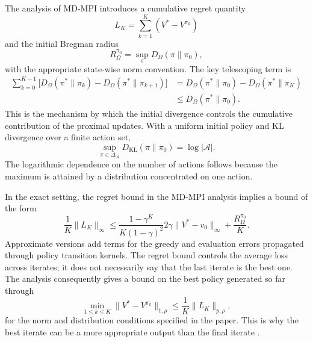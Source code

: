 The analysis of MD-MPI introduces a cumulative regret quantity
\begin{equation}
    L_K=\sum_{k=1}^{K}(V^*-V^{\pi_k})
    \label{eq:rl-mdmpi-regret}
\end{equation}
and the initial Bregman radius
\begin{equation}
    R_{\Omega}^{\pi_0}
    =\sup_{\pi}D_\Omega(\pi\|\pi_0),
    \label{eq:rl-mdmpi-radius}
\end{equation}
with the appropriate state-wise norm convention. The key telescoping term is
\begin{equation}
    \begin{aligned}
    \sum_{k=0}^{K-1}
    \bigl[D_\Omega(\pi^*\|\pi_k)
         -D_\Omega(\pi^*\|\pi_{k+1})\bigr]
    &=D_\Omega(\pi^*\|\pi_0)
      -D_\Omega(\pi^*\|\pi_K)\\
    &\leq D_\Omega(\pi^*\|\pi_0).
    \end{aligned}
    \label{eq:rl-bregman-telescoping}
\end{equation}
This is the mechanism by which the initial divergence controls the cumulative
contribution of the proximal updates. With a uniform initial policy and KL
divergence over a finite action set,
\begin{equation}
    \sup_{\pi\in\Delta_{\mathcal A}}
    D_{\mathrm{KL}}(\pi\|\pi_0)=\log|\mathcal A|.
    \label{eq:rl-uniform-kl-radius}
\end{equation}
The logarithmic dependence on the number of actions follows because the
maximum is attained by a distribution concentrated on one action.

In the exact setting, the regret bound in the MD-MPI analysis implies a bound
of the form
\begin{equation}
    \frac{1}{K}\|L_K\|_\infty
    \leq
    \frac{1-\gamma^K}{K(1-\gamma)^2}
       2\gamma\|V^*-v_0\|_\infty
    +\frac{R_{\Omega}^{\pi_0}}{K}.
    \label{eq:rl-mdmpi-exact-regret-bound}
\end{equation}
Approximate versions add terms for the greedy and evaluation errors propagated
through policy transition kernels. The regret bound controls the average loss
across iterates; it does not necessarily say that the last iterate is the best
one. The analysis consequently gives a bound on the best policy generated so
far through
\begin{equation}
    \min_{1\leq k\leq K}
    \|V^*-V^{\pi_k}\|_{1,\rho}
    \leq\frac{1}{K}\|L_K\|_{p,\rho},
    \label{eq:rl-best-iterate-regret}
\end{equation}
for the norm and distribution conditions specified in the paper. This is why
the best iterate can be a more appropriate output than the final iterate
\parencite{geist2019regularized}.

